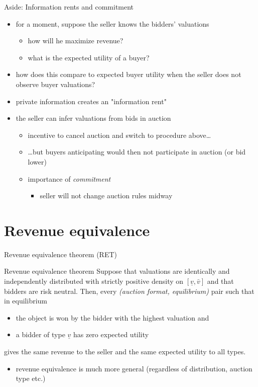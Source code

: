 \documentclass[bigger]{beamer}
\begin{document}
\begin{frame}[label={sec:org02405fc}]{Aside: Information rents and commitment}
\begin{itemize}
\item for a moment, suppose the seller knows the bidders' valuations
\begin{itemize}
\item how will he maximize revenue?
\item what is the expected utility of a buyer?
\end{itemize}
\item how does this compare to expected buyer utility when the seller does not observe buyer valuations?
\pause
\item private information creates an "information rent"
\item the seller can infer valuations from bids in auction
\begin{itemize}
\item incentive to cancel auction and switch to procedure above\ldots{}
\item \ldots{}but buyers anticipating would then not participate in auction (or bid lower)
\item importance of \emph{commitment}
\begin{itemize}
\item seller will not change auction rules midway
\end{itemize}
\end{itemize}
\end{itemize}
\end{frame}


\section{Revenue equivalence}
\label{sec:orgf103267}
\begin{frame}[label={sec:org7c3703d}]{Revenue equivalence theorem (RET)}
\begin{block}{Revenue equivalence theorem}
Suppose that valuations are identically and independently distributed with strictly positive density on \([\underline v,\bar v]\) and that bidders are risk neutral.\linebreak
Then, every \emph{(auction format, equilibrium)} pair such that in equilibrium
\begin{itemize}
\item the object is won by the bidder with the highest valuation and
\item a bidder of type \(\underline v\) has zero expected utility
\end{itemize}
gives the same revenue to the seller and the same expected utility to all types.
\end{block}

\begin{itemize}
\item revenue equivalence is much more general (regardless of distribution, auction type etc.)
\end{itemize}
\end{frame}
\end{document}
